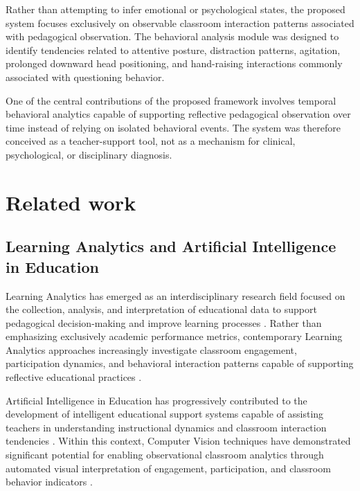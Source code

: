 \documentclass[12pt,a4paper]{article}
\begin{document}
Rather than attempting to infer emotional or psychological states, the proposed system focuses exclusively on observable classroom interaction patterns associated with pedagogical observation. The behavioral analysis module was designed to identify tendencies related to attentive posture, distraction patterns, agitation, prolonged downward head positioning, and hand-raising interactions commonly associated with questioning behavior.

One of the central contributions of the proposed framework involves temporal behavioral analytics capable of supporting reflective pedagogical observation over time instead of relying on isolated behavioral events. The system was therefore conceived as a teacher-support tool, not as a mechanism for clinical, psychological, or disciplinary diagnosis.

\section{Related work}


\subsection{Learning Analytics and Artificial Intelligence in Education}

Learning Analytics has emerged as an interdisciplinary research field focused on the collection, analysis, and interpretation of educational data to support pedagogical decision-making and improve learning processes \cite{araComprehensiveSurveyLearning2023,zhangSmartClassroomsHow2024}. Rather than emphasizing exclusively academic performance metrics, contemporary Learning Analytics approaches increasingly investigate classroom engagement, participation dynamics, and behavioral interaction patterns capable of supporting reflective educational practices \cite{huRealTimeClassroomBehavior2024,mitomaBehaviorMonitoringSystem2025}.

Artificial Intelligence in Education has progressively contributed to the development of intelligent educational support systems capable of assisting teachers in understanding instructional dynamics and classroom interaction tendencies \cite{zhangSmartClassroomsHow2024,huRealTimeClassroomBehavior2024}. Within this context, Computer Vision techniques have demonstrated significant potential for enabling observational classroom analytics through automated visual interpretation of engagement, participation, and classroom behavior indicators \cite{chenStudentBehaviorDetection2023,yuvarajAutomatedRecognitionTeacher2024,yangStudentClassroomBehavior2024}.
\end{document}
